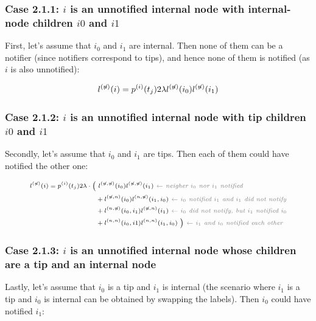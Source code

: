 \documentclass[10pt,letterpaper]{article}
\begin{document}

\subsubsection*{Case 2.1.1: $i$ is an unnotified internal node with internal-node children $i0$ and $i1$}

First, let's assume that $i_0$ and $i_1$ are internal. Then none of them can be a notifier (since notifiers correspond to tips), and hence none of them is notified (as $i$ is also unnotified):

\begin{equation}
\scriptsize
l^{(\not{n})}(i) = p^{(i)}(t_j) 2\lambda l^{(\not{n})}(i_0)l^{(\not{n})}(i_1) \label{eq:lu-int-int}
\end{equation}

\subsubsection*{Case 2.1.2: $i$ is an unnotified internal node with tip children $i0$ and $i1$}

Secondly, let's assume that $i_0$ and $i_1$ are tips. Then each of them could have notified the other one:

\begin{equation}
\scriptsize
\begin{split}
l^{(\not{n})}(i) = p^{(i)}(t_j) 2\lambda \cdot 
\Big(&~l^{(\not{n},\not{n})}(i_0)l^{(\not{n},\not{n})}(i_1) \textit{\color{gray}~$\leftarrow$ neigher $i_0$ nor $i_1$ notified} \\
&+ l^{(\not{n},n)}(i_0)l^{(n,\not{n})}(i_1,i_0) \textit{\color{gray}~$\leftarrow$ $i_0$ notified $i_1$ and $i_1$ did not notify} \\
&+ l^{(n,\not{n})}(i_0,i_1)l^{(\not{n},n)}(i_1) \textit{\color{gray}~$\leftarrow$ $i_0$ did not notify, but $i_1$ notified $i_0$} \\
&+ l^{(n,n)}(i_0,i1)l^{(n,n)}(i_1,i_0)~\Big) \textit{\color{gray}~$\leftarrow$ $i_1$ and $i_0$ notified each other} \\
\end{split}\label{eq:lu-tip-tip}
\end{equation}

\subsubsection*{Case 2.1.3: $i$ is an unnotified internal node whose children are a tip and an internal node}
Lastly, let's assume that $i_0$ is a tip and $i_1$ is internal (the scenario where $i_1$ is a tip and $i_0$ is internal can be obtained by swapping the labels). Then $i_0$ could have notified $i_1$:
\end{document}
